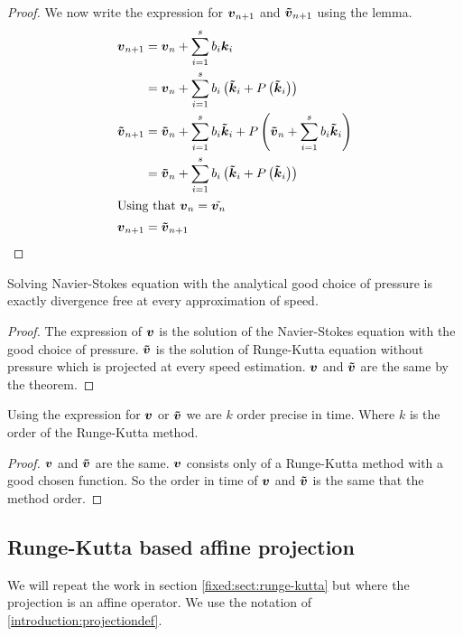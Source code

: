 \begin{proof}
We now write the expression for ${\boldsymbol {v}}_{n+1}$ and ${\boldsymbol {\tilde{v}}}_{n+1}$ using the lemma.
\begin{align*}
{\boldsymbol {v}}_{n+1}&={\boldsymbol {v}}_{n}+\sum_{i=1}^{s}b_{i}{\boldsymbol {k}}_{i}\\
&={\boldsymbol {v}}_{n}+\sum_{i=1}^{s}b_{i}\left({\boldsymbol {\tilde{k}}}_{i}+P\left({\boldsymbol {\tilde{k}}}_{i}\right)\right)\\
{\boldsymbol {\tilde{v}}}_{n+1}&={\boldsymbol {\tilde{v}}}_{n}+\sum_{i=1}^{s}b_{i}{\boldsymbol {\tilde{k}}}_{i}+P\left({\boldsymbol {\tilde{v}}}_{n}+\sum_{i=1}^{s}b_{i}{\boldsymbol {\tilde{k}}}_{i}\right)\\
&={\boldsymbol {\tilde{v}}}_{n}+\sum_{i=1}^{s}b_{i}\left({\boldsymbol {\tilde{k}}}_{i}+P\left({\boldsymbol {\tilde{k}}}_{i}\right)\right)\\
\intertext{Using that ${\boldsymbol {v}}_{n}=\tilde{{\boldsymbol {v}}_{n}}$}
{\boldsymbol {v}}_{n+1}&={\boldsymbol {\tilde{v}}}_{n+1}
\end{align*}

\end{proof}

\begin{corollary}
Solving Navier-Stokes equation with the analytical good choice of pressure is exactly divergence free at every approximation of speed.
\end{corollary}
\begin{proof}
  The expression of ${\boldsymbol {v}}$ is the solution of the Navier-Stokes equation with the good choice of pressure.
  ${\boldsymbol {\tilde{v}}}$ is the solution of Runge-Kutta equation without pressure which is projected at every speed estimation.
  ${\boldsymbol {v}}$ and ${\boldsymbol {\tilde{v}}}$ are the same by the theorem.
\end{proof}

\begin{corollary}
  Using the expression for ${\boldsymbol {v}}$ or ${\boldsymbol {\tilde{v}}}$ we are $k$ order precise in time. Where $k$ is the order of the Runge-Kutta method.
\end{corollary}
\begin{proof}
  ${\boldsymbol {v}}$ and ${\boldsymbol {\tilde{v}}}$ are the same.
  ${\boldsymbol {v}}$ consists only of a Runge-Kutta method with a good chosen function.
  So the order in time of ${\boldsymbol {v}}$ and ${\boldsymbol {\tilde{v}}}$ is the same that the method order.
\end{proof}


\subsection{Runge-Kutta based affine projection}
\label{fixed:sect:runge-kutta:affine}
We will repeat the work in section \ref{fixed:sect:runge-kutta} but where the projection is an affine operator.
We use the notation of \ref{introduction:projectiondef}.

